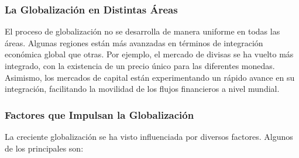 \documentclass[
  a4paper,
]{article}
\begin{document}
\subsubsection{La Globalización en Distintas
Áreas}\label{la-globalizaciuxf3n-en-distintas-uxe1reas}

El proceso de globalización no se desarrolla de manera uniforme en todas
las áreas. Algunas regiones están más avanzadas en términos de
integración económica global que otras. Por ejemplo, el mercado de
divisas se ha vuelto más integrado, con la existencia de un precio único
para las diferentes monedas. Asimismo, los mercados de capital están
experimentando un rápido avance en su integración, facilitando la
movilidad de los flujos financieros a nivel mundial.

\subsubsection{Factores que Impulsan la
Globalización}\label{factores-que-impulsan-la-globalizaciuxf3n}

La creciente globalización se ha visto influenciada por diversos
factores. Algunos de los principales son:
\end{document}
